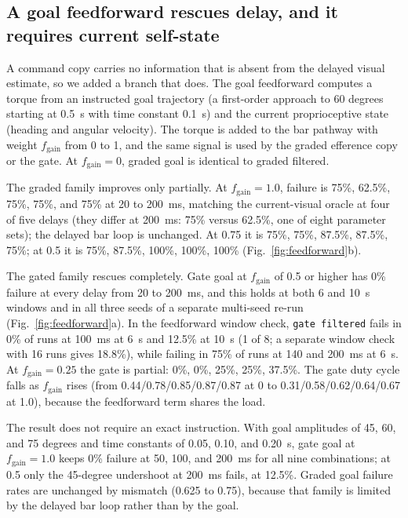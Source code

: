\documentclass[pdflatex,sn-nature]{sn-jnl}
\begin{document}
\subsection{A goal feedforward rescues delay, and it requires current self-state}

A command copy carries no information that is absent from the delayed visual estimate, so we added a branch that does. The goal feedforward computes a torque from an instructed goal trajectory (a first-order approach to 60 degrees starting at 0.5~s with time constant 0.1~s) and the current proprioceptive state (heading and angular velocity). The torque is added to the bar pathway with weight $f_{\mathrm{gain}}$ from 0 to 1, and the same signal is used by the graded efference copy or the gate. At $f_{\mathrm{gain}} = 0$, graded goal is identical to graded filtered.

The graded family improves only partially. At $f_{\mathrm{gain}} = 1.0$, failure is 75\%, 62.5\%, 75\%, 75\%, and 75\% at 20 to 200~ms, matching the current-visual oracle at four of five delays (they differ at 200~ms: 75\% versus 62.5\%, one of eight parameter sets); the delayed bar loop is unchanged. At 0.75 it is 75\%, 75\%, 87.5\%, 87.5\%, 75\%; at 0.5 it is 75\%, 87.5\%, 100\%, 100\%, 100\% (Fig.~\ref{fig:feedforward}b).

The gated family rescues completely. Gate goal at $f_{\mathrm{gain}}$ of 0.5 or higher has 0\% failure at every delay from 20 to 200~ms, and this holds at both 6 and 10~s windows and in all three seeds of a separate multi-seed re-run (Fig.~\ref{fig:feedforward}a). In the feedforward window check, \texttt{gate filtered} fails in 0\% of runs at 100~ms at 6~s and 12.5\% at 10~s (1 of 8; a separate window check with 16 runs gives 18.8\%), while failing in 75\% of runs at 140 and 200~ms at 6~s. At $f_{\mathrm{gain}} = 0.25$ the gate is partial: 0\%, 0\%, 25\%, 25\%, 37.5\%. The gate duty cycle falls as $f_{\mathrm{gain}}$ rises (from 0.44/0.78/0.85/0.87/0.87 at 0 to 0.31/0.58/0.62/0.64/0.67 at 1.0), because the feedforward term shares the load.

The result does not require an exact instruction. With goal amplitudes of 45, 60, and 75 degrees and time constants of 0.05, 0.10, and 0.20~s, gate goal at $f_{\mathrm{gain}} = 1.0$ keeps 0\% failure at 50, 100, and 200~ms for all nine combinations; at 0.5 only the 45-degree undershoot at 200~ms fails, at 12.5\%. Graded goal failure rates are unchanged by mismatch (0.625 to 0.75), because that family is limited by the delayed bar loop rather than by the goal.
\end{document}
